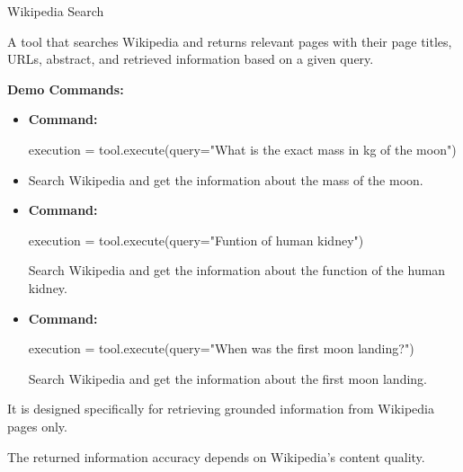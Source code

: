 \begin{tooldescbox}{{Wikipedia Search}}
\setlength{\parindent}{0pt}

 A tool that searches Wikipedia and returns relevant pages with their page titles, URLs, abstract, and retrieved information based on a given query.

\vspace{6pt}


\vspace{4pt}


\vspace{6pt}

\textbf{Demo Commands:}
\begin{itemize}[left=0pt, label={}, itemsep=0pt, parsep=0pt]
\item \textbf{Command:} 
\begin{simplecode}{{execution = tool.execute(query="What is the exact mass in kg of the moon")}}
\end{simplecode}

   \item {} Search Wikipedia and get the information about the mass of the moon.
    
    \vspace{4pt}
    
    \item \textbf{Command:} 
    \begin{simplecode}
    {{execution = tool.execute(query="Funtion of human kidney")}}
    \end{simplecode}
    
     Search Wikipedia and get the information about the function of the human kidney.
    
    \vspace{4pt}
    
    \item \textbf{Command:}  
    \begin{simplecode}
    {{execution = tool.execute(query="When was the first moon landing?")}}
    \end{simplecode}
    
     Search Wikipedia and get the information about the first moon landing.
\end{itemize}
\begin{limitationbox}
\begin{toolenum}
    \item It is designed specifically for retrieving grounded information from Wikipedia pages only.
    \item The returned information accuracy depends on Wikipedia's content quality.
\end{toolenum}
\end{limitationbox}


\end{tooldescbox}
